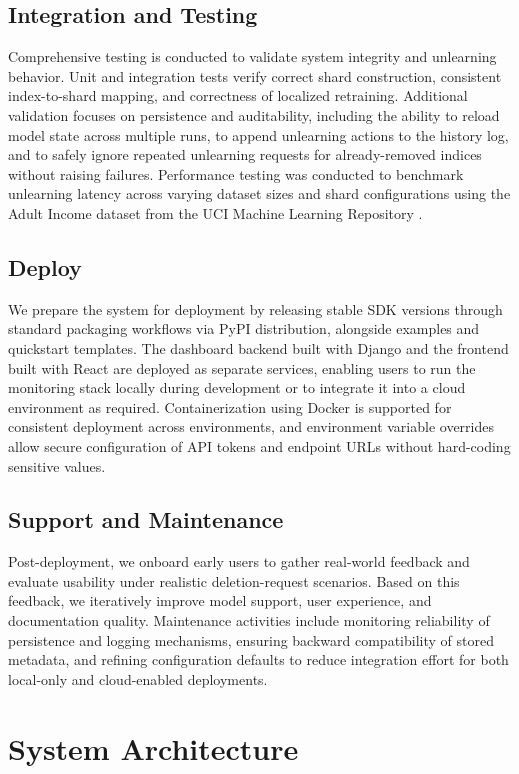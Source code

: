 \subsection{Integration and Testing}
Comprehensive testing is conducted to validate system integrity and unlearning behavior. Unit and integration tests verify correct shard construction, consistent index-to-shard mapping, and correctness of localized retraining. Additional validation focuses on persistence and auditability, including the ability to reload model state across multiple runs, to append unlearning actions to the history log, and to safely ignore repeated unlearning requests for already-removed indices without raising failures. Performance testing was conducted to benchmark unlearning latency across varying dataset sizes and shard configurations using the Adult Income dataset from the UCI Machine Learning Repository \cite{dua2019uci}.

\subsection{Deploy}
We prepare the system for deployment by releasing stable SDK versions through standard packaging workflows via PyPI distribution, alongside examples and quickstart templates. The dashboard backend built with Django and the frontend built with React are deployed as separate services, enabling users to run the monitoring stack locally during development or to integrate it into a cloud environment as required. Containerization using Docker is supported for consistent deployment across environments, and environment variable overrides allow secure configuration of API tokens and endpoint URLs without hard-coding sensitive values.

\subsection{Support and Maintenance}
Post-deployment, we onboard early users to gather real-world feedback and evaluate usability under realistic deletion-request scenarios. Based on this feedback, we iteratively improve model support, user experience, and documentation quality. Maintenance activities include monitoring reliability of persistence and logging mechanisms, ensuring backward compatibility of stored metadata, and refining configuration defaults to reduce integration effort for both local-only and cloud-enabled deployments.

\section{System Architecture}

